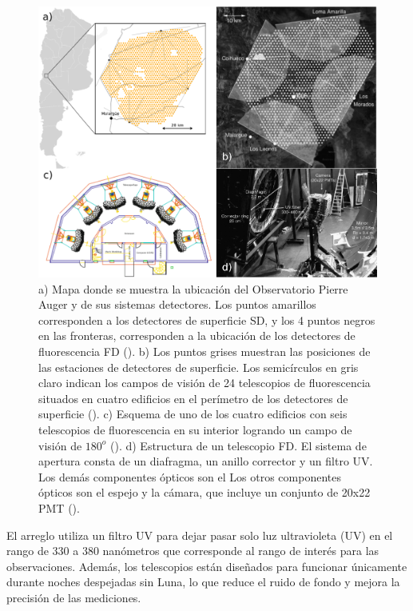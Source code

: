 \begin{figure}[!ht]
\centering
\includegraphics[width=1\textwidth]{Figs/FD_auger_composition.png}
\caption{a) Mapa donde se muestra la ubicación del Observatorio Pierre Auger y de sus sistemas detectores. Los puntos amarillos corresponden a los detectores de superficie SD, y los 4 puntos negros en las fronteras, corresponden a la ubicación de los detectores de fluorescencia FD (\cite{asorey}). b) Los puntos grises muestran las posiciones de las estaciones de detectores de superficie. Los semicírculos en gris claro indican los campos de visión de 24 telescopios de fluorescencia situados en cuatro edificios en el perímetro de los detectores de superficie (\cite{FD_auger}). c) Esquema de uno de los cuatro edificios con seis telescopios de fluorescencia en su interior logrando un campo de visión de $180^{o}$ (\cite{FD_auger}). d) Estructura de un telescopio FD. El sistema de apertura consta de un diafragma, un anillo corrector y un filtro UV. Los demás componentes ópticos son el Los otros componentes ópticos son el espejo y la cámara, que incluye un conjunto de 20x22 PMT (\cite{dedonato_2007}).}
\label{fd_auger}
\end{figure}

El arreglo utiliza un filtro UV para dejar pasar solo luz ultravioleta (UV) en el rango de 330 a 380 nanómetros que corresponde al rango de interés para las observaciones. Además, los telescopios están diseñados para funcionar únicamente durante noches despejadas sin Luna, lo que reduce el ruido de fondo y mejora la precisión de las mediciones. 

